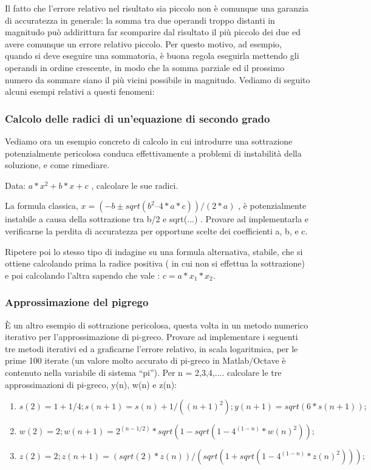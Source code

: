 Il fatto che l’errore relativo nel risultato sia piccolo non è comunque una garanzia di accuratezza  in generale: la somma tra due operandi troppo distanti in magnitudo può addirittura far scomparire dal risultato il più piccolo dei due ed avere comunque un errore relativo piccolo. Per questo motivo, ad esempio,  quando si deve eseguire una sommatoria, è buona regola eseguirla mettendo gli operandi in ordine crescente, in modo che la somma parziale ed il prossimo numero da sommare siano il più vicini possibile in magnitudo.
Vediamo di seguito alcuni esempi relativi a questi fenomeni:

\subsubsection{Calcolo delle radici di un’equazione di secondo grado}

Vediamo ora un esempio concreto di calcolo in cui introdurre una sottrazione potenzialmente pericolosa conduca effettivamente a problemi di instabilità della soluzione, e come rimediare.

Data: $a*x^2 + b*x +c$ , calcolare le sue radici.

La formula classica, $x = (- b \pm sqrt(b^2 – 4*a*c))/(2*a)$ , è potenzialmente instabile a causa della sottrazione tra b/2 e sqrt(...) . Provare ad implementarla e verificarne la perdita di accuratezza per opportune scelte dei coefficienti a, b, e c.

Ripetere poi lo stesso tipo di indagine su una formula alternativa, stabile, che si ottiene calcolando prima la radice positiva ( in cui non si effettua la sottrazione) e poi calcolando l’altra sapendo che vale :  $c = a * x_1 * x_2$.


\subsubsection{Approssimazione del pigrego}

È un altro esempio di sottrazione pericolosa, questa volta in un metodo numerico iterativo per l’approssimazione di pi-greco. Provare ad implementare i seguenti tre metodi iterativi ed a graficarne l’errore relativo, in scala logaritmica, per le prime 100 iterate (un valore molto accurato di pi-greco in Matlab/Octave è contenuto nella variabile di sistema “pi”). Per n = 2,3,4,.... calcolare le tre approssimazioni di pi-greco, y(n), w(n) e z(n):

\begin{enumerate}
	\item $s(2)=1+1/4;	s(n+1)=s(n)+1/((n+1)^2);	y(n+1)= sqrt(6*s(n+1));$
	\item $w(2)=2;	w(n+1)=2^(n-1/2)*sqrt(1-sqrt(1-4^(1-n)*w(n)^2));$
	\item $z(2)=2;	z(n+1)=(sqrt(2)*z(n))/(sqrt(1+sqrt(1-4^(1-n)*z(n)^2)));$
\end{enumerate}

